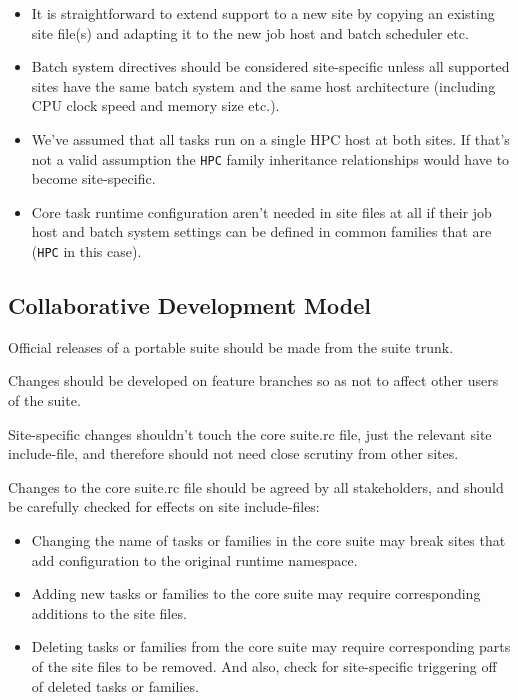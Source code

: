\begin{itemize}
  \item It is straightforward to extend support to a new site by copying an
    existing site file(s) and adapting it to the new job host and batch
    scheduler etc.

  \item Batch system directives should be considered site-specific unless
    all supported sites have the same batch system and the same host
    architecture (including CPU clock speed and memory size etc.).

  \item We've assumed that all tasks run on a single HPC host at both
    sites. If that's not a valid assumption the \lstinline=HPC= family
    inheritance relationships would have to become site-specific.

  \item Core task runtime configuration aren't needed in site files at all
    if their job host and batch system settings can be defined in common
    families that are (\lstinline=HPC= in this case).
\end{itemize}


\subsection{Collaborative Development Model}
\label{Collaborative Development Model}

Official releases of a portable suite should be made from the suite trunk.

Changes should be developed on feature branches so as not to affect other users
of the suite.

Site-specific changes shouldn't touch the core suite.rc file, just the relevant
site include-file, and therefore should not need close scrutiny from other
sites.

Changes to the core suite.rc file should be agreed by all stakeholders, and
should be carefully checked for effects on site include-files:

\begin{itemize}
  \item Changing the name of tasks or families in the core suite may break
    sites that add configuration to the original runtime namespace.
  \item Adding new tasks or families to the core suite may require
    corresponding additions to the site files.
  \item Deleting tasks or families from the core suite may require
    corresponding parts of the site files to be removed. And also, check for
    site-specific triggering off of deleted tasks or families.
\end{itemize}

